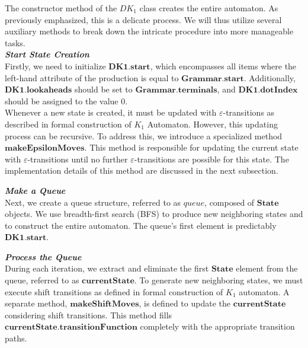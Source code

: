 The constructor method of the \(DK_{1}\) class creates the entire automaton. As previously emphasized, this is a delicate process. We will thus utilize several auxiliary methods to break down the intricate procedure into more manageable tasks.\\

\textbf{\textit{Start State Creation}}\\

Firstly, we need to initialize \(\boldsymbol{DK1.start}\), which encompasses all items where the left-hand attribute of the production is equal to \(\boldsymbol{Grammar.start}\). Additionally, \(\boldsymbol{DK1.lookaheads}\) should be set to \(\boldsymbol{Grammar.terminals}\), and \(\boldsymbol{DK1.dotIndex}\) should be assigned to the value 0.\\

Whenever a new state is created, it must be updated with \(\varepsilon\)-transitions as described in formal construction of \({K_{1}}\) Automaton. However, this updating process can be recursive. To address this, we introduce a specialized method \(\boldsymbol{makeEpsilonMoves}\). This method is responsible for updating the current state with \(\varepsilon\)-transitions until no further \(\varepsilon\)-transitions are possible for this state. The implementation details of this method are discussed in the next subsection.\\

\vspace{15pt}

\textbf{\textit{Make a Queue}}\\

Next, we create a queue structure, referred to as \(queue\), composed of \(\boldsymbol{State}\) objects. We use breadth-first search (BFS) to produce new neighboring states and to construct the entire automaton. The queue's first element is predictably \(\boldsymbol{DK1.start}\).\\

\vspace{15pt}

\textbf{\textit{Process the Queue}}\\

During each iteration, we extract and eliminate the first \(\boldsymbol{State}\) element from the queue, referred to as \(\boldsymbol{currentState}\). To generate new neighboring states, we must execute shift transitions as defined in formal construction of \({K_{1}}\) automaton. A separate method, \(\boldsymbol{makeShiftMoves}\), is defined to update the \(\boldsymbol{currentState}\) considering shift transitions. This method fills \(\boldsymbol{currentState.transitionFunction}\) completely with the appropriate transition paths.\\

